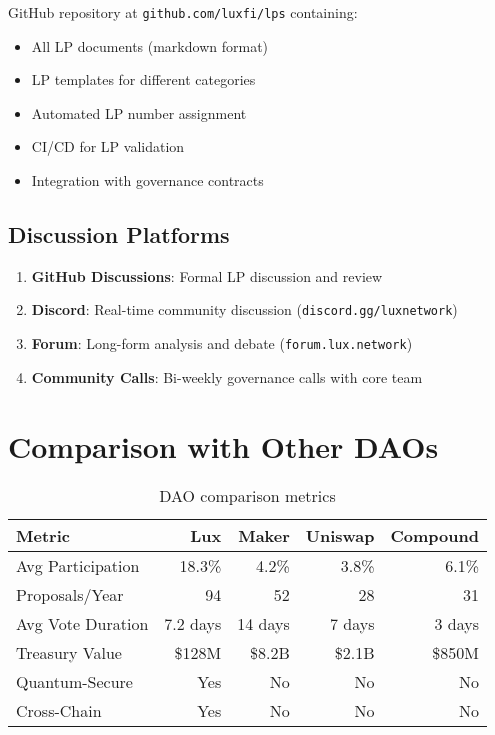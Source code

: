 \documentclass[11pt,a4paper]{article}
\begin{document}
GitHub repository at \texttt{github.com/luxfi/lps} containing:

\begin{itemize}
\item All LP documents (markdown format)
\item LP templates for different categories
\item Automated LP number assignment
\item CI/CD for LP validation
\item Integration with governance contracts
\end{itemize}

\subsection{Discussion Platforms}

\begin{enumerate}
\item \textbf{GitHub Discussions}: Formal LP discussion and review
\item \textbf{Discord}: Real-time community discussion (\texttt{discord.gg/luxnetwork})
\item \textbf{Forum}: Long-form analysis and debate (\texttt{forum.lux.network})
\item \textbf{Community Calls}: Bi-weekly governance calls with core team
\end{enumerate}

\section{Comparison with Other DAOs}

\begin{table}[h]
\centering
\small
\begin{tabular}{@{}lrrrr@{}}
\toprule
\textbf{Metric} & \textbf{Lux} & \textbf{Maker} & \textbf{Uniswap} & \textbf{Compound} \\ \midrule
Avg Participation & 18.3\% & 4.2\% & 3.8\% & 6.1\% \\
Proposals/Year & 94 & 52 & 28 & 31 \\
Avg Vote Duration & 7.2 days & 14 days & 7 days & 3 days \\
Treasury Value & \$128M & \$8.2B & \$2.1B & \$850M \\
Quantum-Secure & Yes & No & No & No \\
Cross-Chain & Yes & No & No & No \\ \bottomrule
\end{tabular}
\caption{DAO comparison metrics}
\end{table}
\end{document}
